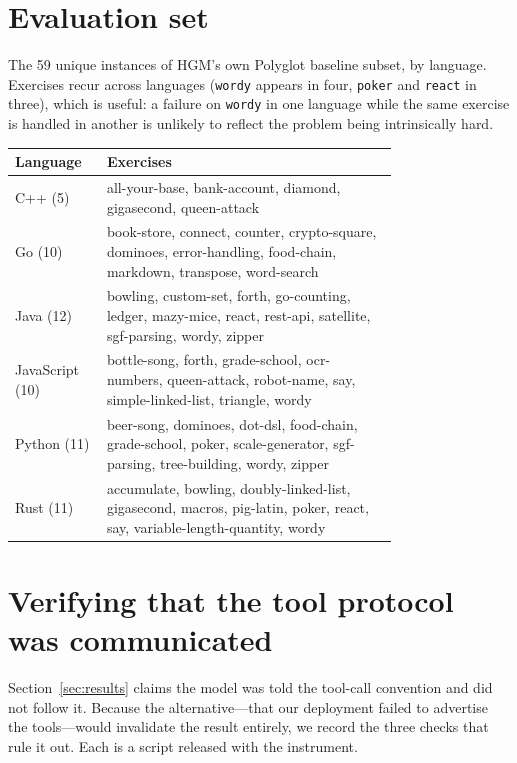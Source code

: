 \documentclass{article}
\begin{document}



\appendix

\section{Evaluation set}
\label{app:tasks}

The 59 unique instances of HGM's own Polyglot baseline subset, by language.
Exercises recur across languages (\texttt{wordy} appears in four,
\texttt{poker} and \texttt{react} in three), which is useful: a failure on
\texttt{wordy} in one language while the same exercise is handled in another
is unlikely to reflect the problem being intrinsically hard.

\begin{table}[h]
\centering
\small
\begin{tabular}{lp{0.76\linewidth}}
\toprule
Language & Exercises \\
\midrule
C++ (5) & all-your-base, bank-account, diamond, gigasecond, queen-attack \\
\addlinespace
Go (10) & book-store, connect, counter, crypto-square, dominoes,
error-handling, food-chain, markdown, transpose, word-search \\
\addlinespace
Java (12) & bowling, custom-set, forth, go-counting, ledger, mazy-mice,
react, rest-api, satellite, sgf-parsing, wordy, zipper \\
\addlinespace
JavaScript (10) & bottle-song, forth, grade-school, ocr-numbers,
queen-attack, robot-name, say, simple-linked-list, triangle, wordy \\
\addlinespace
Python (11) & beer-song, dominoes, dot-dsl, food-chain, grade-school, poker,
scale-generator, sgf-parsing, tree-building, wordy, zipper \\
\addlinespace
Rust (11) & accumulate, bowling, doubly-linked-list, gigasecond, macros,
pig-latin, poker, react, say, variable-length-quantity, wordy \\
\bottomrule
\end{tabular}
\end{table}

\section{Verifying that the tool protocol was communicated}
\label{app:protocol}

Section~\ref{sec:results} claims the model was told the tool-call convention
and did not follow it. Because the alternative---that our deployment failed
to advertise the tools---would invalidate the result entirely, we record the
three checks that rule it out. Each is a script released with the instrument.
\end{document}
